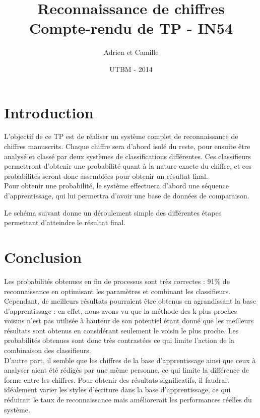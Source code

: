 \documentclass[a4paper,11pt]{article}
\title{Reconnaissance de chiffres\\Compte-rendu de TP - IN54}
\author{Adrien \bsc{Berthet} et Camille \bsc{Mougin}}
\date{UTBM - \bsc{Automne} 2014}
\begin{document}
\maketitle


\section*{Introduction}
L'objectif de ce TP est de réaliser un système complet de reconnaissance de chiffres manuscrits. Chaque chiffre sera d'abord isolé du reste, pour ensuite être analysé et classé par deux systèmes de classifications différentes. Ces classifieurs permettront d'obtenir une probabilité quant à la nature exacte du chiffre, et ces probabilités seront donc assemblées pour obtenir un résultat final.\\
Pour obtenir une probabilité, le système effectuera d'abord une séquence d'apprentissage, qui lui permettra d'avoir une base de données de comparaison.

Le schéma suivant donne un déroulement simple des différentes étapes permettant d'atteindre le résultat final.


\newpage


\newpage


\newpage



\section*{Conclusion}

Les probabilités obtenues en fin de processus sont très correctes : 91\% de reconnaissance en optimisant les paramètres et combinant les classifieurs.\\
Cependant, de meilleurs résultats pourraient être obtenus en agrandissant la base d'apprentissage : en effet, nous avons vu que la méthode des k plus proches voisins n'est pas utilisée à hauteur de son potentiel étant donné que les meilleurs résultats sont obtenus en considérant seulement le voisin le plus proche. Les probabilités obtenues sont donc très contrastées ce qui limite l'action de la combinaison des classifieurs.\\
D'autre part, il semble que les chiffres de la base d'apprentissage ainsi que ceux à analyser aient été rédigés par une même personne, ce qui limite la différence de forme entre les chiffres. Pour obtenir des résultats significatifs, il faudrait idéalement varier les styles d'écriture dans la base d'apprentissage, ce qui réduirait le taux de reconnaissance mais améliorerait les performances réelles du système.
\end{document}
